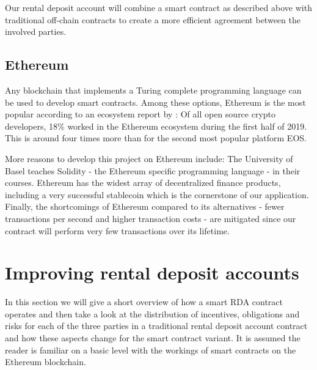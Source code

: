 \documentclass[12pt,a4paper,titlepage,oneside,english]{article}
\begin{document}
Our rental deposit account will combine a smart contract as described above with traditional off-chain contracts to create a more efficient agreement between the involved parties.

\subsection{Ethereum}
\label{sub:ethereum}

Any blockchain that implements a Turing complete programming language can be used to develop smart contracts. Among these options, Ethereum is the most popular according to an ecosystem report by \cite{ElectricCapital2019}: Of all open source crypto developers, 18\% worked in the Ethereum ecosystem during the first half of 2019. This is around four times more than for the second most popular platform EOS.

More reasons to develop this project on Ethereum include: The University of Basel teaches Solidity - the Ethereum specific programming language - in their courses. Ethereum has the widest array of decentralized finance products, including a very successful stablecoin which is the cornerstone of our application. Finally, the shortcomings of Ethereum compared to its alternatives - fewer transactions per second and higher transaction costs - are mitigated since our contract will perform very few transactions over its lifetime.




\section{Improving rental deposit accounts}
In this section we will give a short overview of how a smart RDA contract operates and then take a look at the distribution of incentives, obligations and risks for each of the three parties in a traditional rental deposit account contract and how these aspects change for the smart contract variant.
It is assumed the reader is familiar on a basic level with the workings of smart contracts on the Ethereum blockchain.
\end{document}
